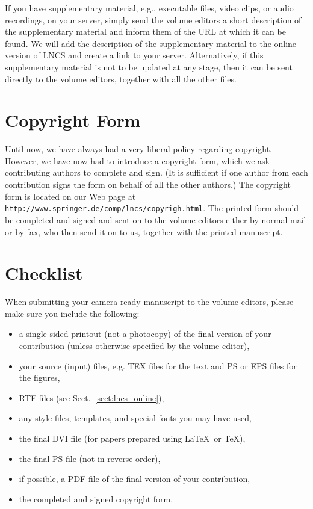 \documentclass[a4paper]{llncs}
\begin{document}
If you have supplementary material, e.g., executable files, video clips,
or audio recordings, on your server, simply send the volume editors a
short description of the supplementary material and inform them of the
URL at which it can be found.
We will add the description of the supplementary material to the online
version of LNCS and create a link to your server. Alternatively, if this
supplementary material is not to be updated at any stage, then it can be
sent directly to the volume editors, together with all the other files.


\section{Copyright Form}

Until now, we have always had a very liberal policy regarding copyright.
However, we have now had to introduce a copyright form, which we ask
contributing authors to complete and
sign. (It is sufficient if one author from each contribution signs
the form on behalf of all the other authors.)
The copyright form is
located on our Web page at
\verb+http://www.springer.de/comp/lncs/copyrigh.html+.
The printed form should be completed and signed and sent
on to the volume editors either by normal mail or by fax, who then send
it on to us, together with the printed manuscript.


\section{Checklist}

When submitting your camera-ready manuscript to the volume editors,
please make sure you include the following:
\begin{itemize}
\item a single-sided printout (not a photocopy) of the final version of
your contribution
(unless otherwise specified by the volume editor),
\item your source (input) files, e.g. TEX files for the text and PS or
EPS files for the figures,
\item RTF files (see Sect.~\ref{sect:lncs_online}),
\item any style files, templates, and special fonts you may have used,
\item the final DVI file (for papers prepared using \LaTeX\ or  \TeX),
\item the final PS file (not in reverse order),
\item if possible, a PDF file of the final version of your
contribution,
\item the completed and signed copyright form.
\end{itemize}
\end{document}
